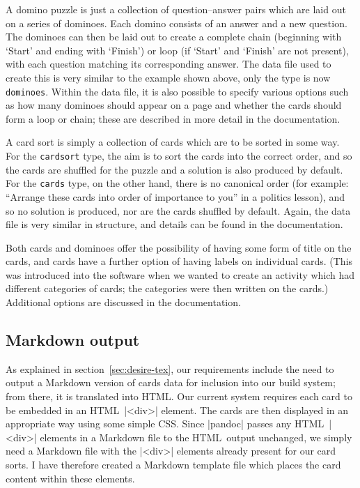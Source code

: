\documentclass{article}
\def\HTML{{\small HTML}}
\def\CSS{{\small CSS}}
\begin{document}
A domino puzzle is just a collection of question--answer pairs
which are laid out on a series of dominoes.  Each domino consists of
an answer and a new question.  The dominoes can then be laid out to
create a complete chain (beginning with `Start' and ending with
`Finish') or loop (if `Start' and `Finish' are not present), with each
question matching its corresponding answer.  The data file used to
create this is very similar to the example shown above, only the type is
now \texttt{dominoes}.  Within the data file, it is also possible to specify
various options such as how many dominoes should appear on a page and
whether the cards should form a loop or chain; these are described in
more detail in the documentation.

A card sort is simply a collection of cards which are to be sorted in
some way.  For the \texttt{cardsort} type, the aim is to sort the cards into
the correct order, and so the cards are shuffled for the puzzle and a
solution is also produced by default.  For the \texttt{cards} type, on the
other hand, there is no canonical order (for example: ``Arrange these
cards into order of importance to you'' in a politics
lesson), and so no solution is produced, nor are the cards shuffled by
default.  Again, the data file is very similar in structure, and
details can be found in the documentation.

Both cards and dominoes offer the possibility of having some form of
title on the cards, and cards have a further option of having labels
on individual cards.  (This was introduced into the software when we
wanted to create an activity which had different categories of cards;
the categories were then written on the cards.)  Additional options
are discussed in the documentation.

\subsection{Markdown output}

As explained in section~\ref{sec:desire-tex}, our requirements include
the need to output a Markdown version of cards data for inclusion into
our build system; from there, it is translated into \HTML.  Our
current system requires each card to be embedded in an \HTML\
|<div>| element.  The cards are then displayed in an appropriate
way using some simple \CSS.  Since |pandoc| passes any \HTML\
|<div>| elements in a Markdown file to the \HTML\ output
unchanged, we simply need a Markdown file with the |<div>|
elements already present for our card sorts.  I have therefore created
a Markdown template file which places the card content within these
elements.
\end{document}
